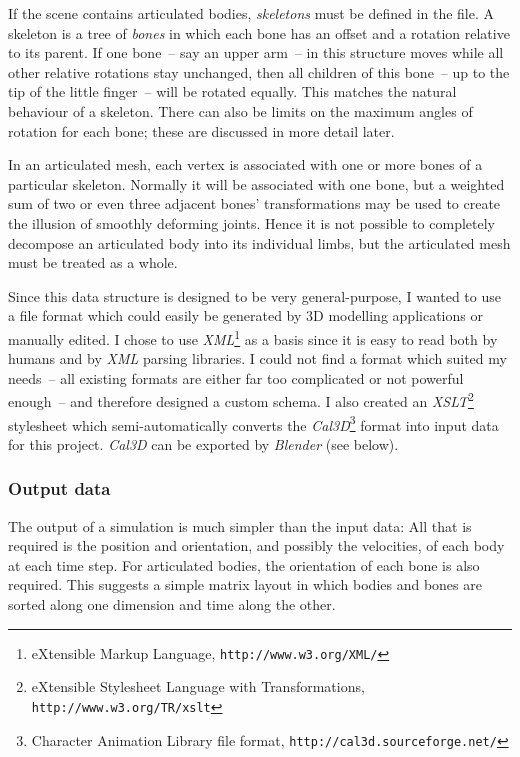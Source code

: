 If the scene contains articulated bodies, \emph{skeletons} must be defined in the file. A skeleton
is a tree of \emph{bones} in which each bone has an offset and a rotation relative to its parent.
If one bone~-- say an upper arm~-- in this structure moves while all other relative rotations stay
unchanged, then all children of this bone~-- up to the tip of the little finger~-- will be rotated
equally. This matches the natural behaviour of a skeleton. There can also be limits on the maximum
angles of rotation for each bone; these are discussed in more detail later.

In an articulated mesh, each vertex is associated with one or more bones of a particular skeleton.
Normally it will be associated with one bone, but a weighted sum of two or even three adjacent
bones' transformations may be used to create the illusion of smoothly deforming joints. Hence it
is not possible to completely decompose an articulated body into its individual limbs, but the
articulated mesh must be treated as a whole.

Since this data structure is designed to be very general-purpose, I wanted to use a file format
which could easily be generated by 3D modelling applications or manually edited. I chose to use
\textsl{XML}\footnote{eXtensible Markup Language, \texttt{http://www.w3.org/XML/}} as a basis
since it is easy to read both by humans and by \textsl{XML} parsing libraries. I could not
find a format which suited my needs~-- all existing formats are either far too complicated or not
powerful enough~-- and therefore designed a custom schema. I also created an
\textsl{XSLT}\footnote{eXtensible Stylesheet Language with Transformations,
\texttt{http://www.w3.org/TR/xslt}} stylesheet which semi-automatically converts the
\textsl{Cal3D}\footnote{Character Animation Library file format, \texttt{http://cal3d.sourceforge.net/}}
format into input data for this project. \textsl{Cal3D} can be exported by \textsl{Blender}
(see below).

\subsubsection{Output data}
The output of a simulation is much simpler than the input data: All that is required is the
position and orientation, and possibly the velocities, of each body at each time step. For
articulated bodies, the orientation of each bone is also required. This suggests a simple
matrix layout in which bodies and bones are sorted along one dimension and time along
the other.

